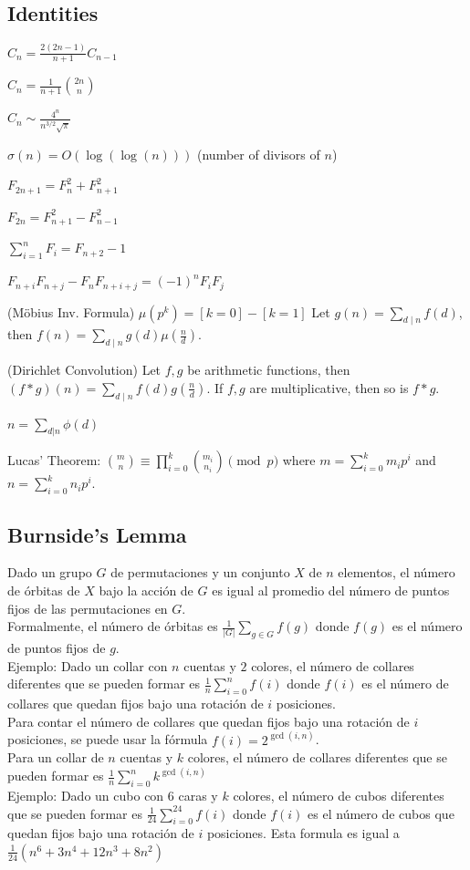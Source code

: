 \subsection{Identities}
	{
		$C_n = \frac{2(2n-1)}{n+1} C_{n-1}$

		$C_n = \frac{1}{n+1} \binom{2n}{n}$

		$C_n \sim \frac{4^n}{n^{3/2}\sqrt{\pi}}$

		$\sigma(n) = O(\log(\log(n)))$ (number of divisors of $n$)

		$F_{2n+1} = F_{n}^2 + F_{n+1}^2$

		$F_{2n} = F_{n+1}^2 - F_{n-1}^2$

		$\sum_{i=1}^n F_i = F_{n+2}-1$

		$F_{n+i}F_{n+j} - F_nF_{n+i+j} = (-1)^n F_iF_j$

		(Möbius Inv. Formula)
		$\mu(p^k) = [k=0] - [k=1]$
		Let $g(n) = \sum_{d\mid n} f(d)$, then $f(n)=\sum_{d\mid n} g(d) \mu\left(\frac{n}{d}\right)$.

		(Dirichlet Convolution)
		Let $f,g$ be arithmetic functions, then $(f*g)(n) = \sum_{d\mid n} f(d)g\left(\frac{n}{d}\right)$.
		If $f,g$ are multiplicative, then so is $f*g$.

		$n=\sum_{d|n}\phi(d)$

		Lucas' Theorem: $\binom{m}{n} \equiv \prod_{i=0}^k \binom{m_i}{n_i} \pmod{p}$ where $m = \sum_{i=0}^k m_i p^i$ and $n = \sum_{i=0}^k n_i p^i$.
	}
	\subsection{Burnside's Lemma}
		\begin{flushleft}
		Dado un grupo $G$ de permutaciones y un conjunto $X$ de $n$ elementos, 
		el número de órbitas de $X$ bajo la acción de $G$ es igual al promedio
		del número de puntos fijos de las permutaciones en $G$.\\
		Formalmente, el número de órbitas es $\frac{1}{|G|} \sum_{g \in G} f(g)$ donde $f(g)$ es el número de puntos fijos de $g$.\\
		Ejemplo: Dado un collar con $n$ cuentas y $2$ colores, el número de collares
		diferentes que se pueden formar es $\frac{1}{n} \sum_{i=0}^{n} f(i)$ donde $f(i)$ es el número de collares
		que quedan fijos bajo una rotación de $i$ posiciones.\\
		Para contar el número de collares que quedan fijos bajo una rotación de $i$ posiciones, se puede usar
		la fórmula $f(i) = 2^{\gcd(i,n)}$.\\
		Para un collar de $n$ cuentas y $k$ colores, el número de collares diferentes que se pueden formar
		es $\frac{1}{n} \sum_{i=0}^{n} k^{\gcd(i,n)}$\\
		Ejemplo: Dado un cubo con $6$ caras y $k$ colores, el número de cubos diferentes que se pueden formar
		es $\frac{1}{24} \sum_{i=0}^{24} f(i)$ donde $f(i)$ es el número de cubos que quedan fijos bajo una rotación de $i$ posiciones.
		Esta formula es igual a $\frac{1}{24} (n^6+3n^4+12n^3+8n^2)$
		\end{flushleft}
